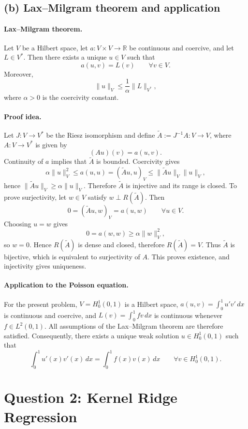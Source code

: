 \documentclass[11pt,en]{elegantpaper}
\newcommand{\R}{\mathbb{R}}
\begin{document}
\subsection*{(b) Lax--Milgram theorem and application}

\paragraph{Lax--Milgram theorem.}
Let \(V\) be a Hilbert space, let \(a:V\times V\to\R\) be continuous and coercive, and
let \(L\in V^\ast\). Then there exists a unique \(u\in V\) such that
\[
a(u,v)=L(v)\qquad \forall v\in V.
\]
Moreover,
\[
\|u\|_V\le \frac{1}{\alpha}\|L\|_{V^\ast},
\]
where \(\alpha>0\) is the coercivity constant.

\paragraph{Proof idea.}
Let \(J:V\to V^\ast\) be the Riesz isomorphism and define
\(\widetilde A:=J^{-1}A:V\to V\), where \(A:V\to V^\ast\) is given by
\[
(Au)(v)=a(u,v).
\]
Continuity of \(a\) implies that \(\widetilde A\) is bounded. Coercivity gives
\[
\alpha \|u\|_V^2\le a(u,u)=(\widetilde A u,u)_V\le \|\widetilde A u\|_V\|u\|_V,
\]
hence \(\|\widetilde A u\|_V\ge \alpha \|u\|_V\). Therefore \(\widetilde A\) is
injective and its range is closed. To prove surjectivity, let \(w\in V\) satisfy
\(w\perp R(\widetilde A)\). Then
\[
0=(\widetilde A u,w)_V=a(u,w)\qquad \forall u\in V.
\]
Choosing \(u=w\) gives
\[
0=a(w,w)\ge \alpha \|w\|_V^2,
\]
so \(w=0\). Hence \(R(\widetilde A)\) is dense and closed, therefore
\(R(\widetilde A)=V\). Thus \(\widetilde A\) is bijective, which is equivalent to
surjectivity of \(A\). This proves existence, and injectivity gives uniqueness.

\paragraph{Application to the Poisson equation.}
For the present problem, \(V=H_0^1(0,1)\) is a Hilbert space,
\(a(u,v)=\int_0^1 u'v'\,dx\) is continuous and coercive, and
\(L(v)=\int_0^1 fv\,dx\) is continuous whenever \(f\in L^2(0,1)\). All assumptions of
the Lax--Milgram theorem are therefore satisfied. Consequently, there exists a unique
weak solution \(u\in H_0^1(0,1)\) such that
\[
\int_0^1 u'(x)v'(x)\,dx=\int_0^1 f(x)v(x)\,dx\qquad \forall v\in H_0^1(0,1).
\]

\section*{Question 2: Kernel Ridge Regression}
\end{document}
